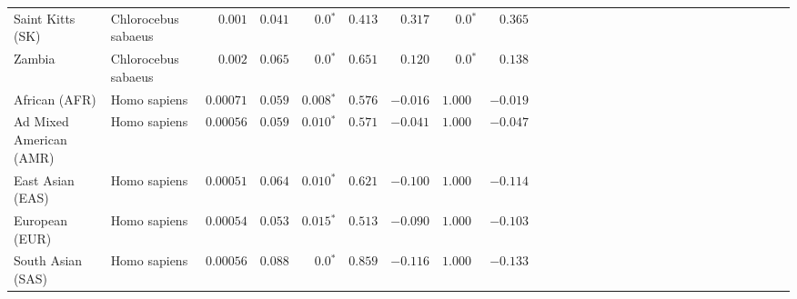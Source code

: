 \begin{center}
\begin{adjustbox}{width = 1\textwidth}
\begin{tabular}{|l|l|r|r|r|r|r|r|r|r|r|r|r|r|r|r|r|r|r|r|r|r|r|r|r|r|r|r|r|}
               Saint Kitts (SK) &  Chlorocebus sabaeus &           $ 0.001$ &                      $ 0.041$ &                  $\bm{0.0{^*}}$ &                                           $ 0.413$ &                      $ 0.317$ &                  $\bm{0.0{^*}}$ &                                           $ 0.365$ \\
                         Zambia &  Chlorocebus sabaeus &           $ 0.002$ &                      $ 0.065$ &                  $\bm{0.0{^*}}$ &                                           $ 0.651$ &                      $ 0.120$ &                  $\bm{0.0{^*}}$ &                                           $ 0.138$ \\
                  African (AFR) &         Homo sapiens &          $0.00071$ &                      $ 0.059$ &               $\bm{ 0.008{^*}}$ &                                           $ 0.576$ &                      $-0.016$ &                      $ 1.000~~$ &                                           $-0.019$ \\
        Ad Mixed American (AMR) &         Homo sapiens &          $0.00056$ &                      $ 0.059$ &               $\bm{ 0.010{^*}}$ &                                           $ 0.571$ &                      $-0.041$ &                      $ 1.000~~$ &                                           $-0.047$ \\
               East Asian (EAS) &         Homo sapiens &          $0.00051$ &                      $ 0.064$ &               $\bm{ 0.010{^*}}$ &                                           $ 0.621$ &                      $-0.100$ &                      $ 1.000~~$ &                                           $-0.114$ \\
                 European (EUR) &         Homo sapiens &          $0.00054$ &                      $ 0.053$ &               $\bm{ 0.015{^*}}$ &                                           $ 0.513$ &                      $-0.090$ &                      $ 1.000~~$ &                                           $-0.103$ \\
              South Asian (SAS) &         Homo sapiens &          $0.00056$ &                      $ 0.088$ &                  $\bm{0.0{^*}}$ &                                           $ 0.859$ &                      $-0.116$ &                      $ 1.000~~$ &                                           $-0.133$ \\
\bottomrule
\end{tabular}
\end{adjustbox}
\end{center}
\newpage
